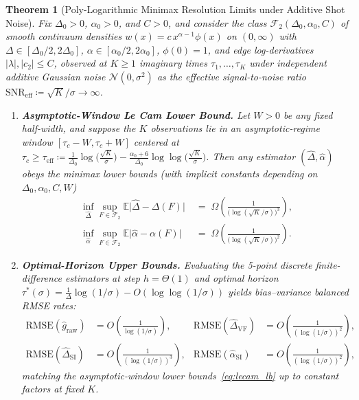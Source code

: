 \documentclass[11pt,a4paper]{article}
\newtheorem{theorem}{Theorem}[section]
\theoremstyle{definition}
\newcommand{\E}{\mathbb{E}}
\begin{document}
\begin{theorem}[Poly-Logarithmic Minimax Resolution Limits under Additive Shot Noise]
\label{thm:minimax}
Fix $\Delta_0 > 0$, $\alpha_0 > 0$, and $C > 0$, and consider the class $\mathcal{F}_2(\Delta_0, \alpha_0, C)$ of smooth continuum densities $w(x) = c\, x^{\alpha - 1} \phi(x)$ on $(0, \infty)$ with $\Delta \in [\Delta_0/2, 2\Delta_0]$, $\alpha \in [\alpha_0/2, 2\alpha_0]$, $\phi(0) = 1$, and edge log-derivatives $|\lambda|, |c_2| \le C$, observed at $K \ge 1$ imaginary times $\tau_1, \dots, \tau_K$ under independent additive Gaussian noise $\mathcal{N}(0, \sigma^2)$ as the effective signal-to-noise ratio $\mathrm{SNR}_{\mathrm{eff}} \coloneqq \sqrt{K}/\sigma \to \infty$.
\begin{enumerate}[label=(\alph*),leftmargin=2em,itemsep=2pt]
  \item \textbf{Asymptotic-Window Le Cam Lower Bound.} Let $W > 0$ be any fixed half-width, and suppose the $K$ observations lie in an asymptotic-regime window $[\tau_c - W, \tau_c + W]$ centered at $\tau_c \ge \tau_{\mathrm{eff}} \coloneqq \frac{1}{\Delta_0}\log\!\bigl(\frac{\sqrt{K}}{\sigma}\bigr) - \frac{\alpha_0 + 6}{\Delta_0}\log\log\!\bigl(\frac{\sqrt{K}}{\sigma}\bigr)$. Then any estimator $(\widehat{\Delta}, \widehat{\alpha})$ obeys the minimax lower bounds (with implicit constants depending on $\Delta_0, \alpha_0, C, W$)
  \begin{align}
    \inf_{\widehat{\Delta}} \sup_{F \in \mathcal{F}_2} \E\bigl|\widehat{\Delta} - \Delta(F)\bigr|
    &\;=\; \Omega\!\left(\frac{1}{\bigl(\log(\sqrt{K}/\sigma)\bigr)^3}\right), \nonumber\\
    \inf_{\widehat{\alpha}} \sup_{F \in \mathcal{F}_2} \E\bigl|\widehat{\alpha} - \alpha(F)\bigr|
    &\;=\; \Omega\!\left(\frac{1}{\bigl(\log(\sqrt{K}/\sigma)\bigr)^2}\right).
    \label{eq:lecam_lb}
  \end{align}
  \item \textbf{Optimal-Horizon Upper Bounds.} Evaluating the 5-point discrete finite-difference estimators at step $h = \Theta(1)$ and optimal horizon $\tau^*(\sigma) = \frac{1}{\Delta} \log(1/\sigma) - O(\log\log(1/\sigma))$ yields bias--variance balanced RMSE rates:
  \begin{align*}
    \mathrm{RMSE}(\widehat{g}_{\mathrm{raw}}) &= O\!\left(\frac{1}{\log(1/\sigma)}\right), &
    \mathrm{RMSE}(\widehat{\Delta}_{\mathrm{VF}}) &= O\!\left(\frac{1}{(\log(1/\sigma))^2}\right), \\
    \mathrm{RMSE}(\widehat{\Delta}_{\mathrm{SI}}) &= O\!\left(\frac{1}{(\log(1/\sigma))^3}\right), &
    \mathrm{RMSE}(\widehat{\alpha}_{\mathrm{SI}}) &= O\!\left(\frac{1}{(\log(1/\sigma))^2}\right),
  \end{align*}
  matching the asymptotic-window lower bounds~\eqref{eq:lecam_lb} up to constant factors at fixed $K$.
\end{enumerate}
\end{theorem}
\end{document}
